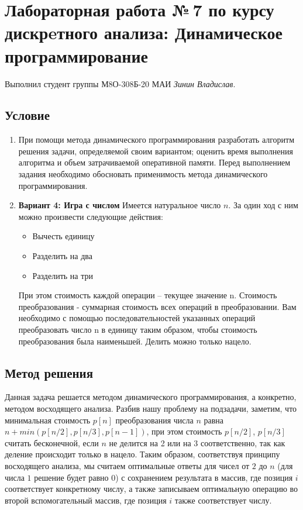 \documentclass[12pt]{article}
\begin{document}
    \section*{Лабораторная работа №\,7 по курсу дискрeтного анализа: 
    Динамическое программирование}

    Выполнил студент группы М8О-308Б-20 МАИ \textit{Зинин Владислав}.

    \subsection*{Условие}
 
    \begin{enumerate}
    \item При помощи метода динамического программирования разработать алгоритм 
    решения задачи, определяемой своим вариантом; оценить время выполнения 
    алгоритма и объем затрачиваемой оперативной памяти. Перед выполнением 
    задания необходимо обосновать применимость метода динамического 
    программирования.
    \item \textbf{Вариант 4: Игра с числом} Имеется натуральное число $n$. 
    За один ход с ним можно произвести следующие действия:
    \begin{itemize}
        \item Вычесть единицу
        \item Разделить на два
        \item Разделить на три
    \end{itemize}
    При этом стоимость каждой операции – текущее значение n. Стоимость преобразования - суммарная стоимость всех операций в преобразовании. 
    Вам необходимо с помощью последовательностей указанных операций преобразовать число n в единицу таким образом, чтобы стоимость преобразования была наименьшей. 
    Делить можно только нацело.
    \end{enumerate}

    \subsection*{Метод решения}

    Данная задача решается методом динамического программирования, а конкретно, методом восходящего анализа. Разбив нашу проблему на 
    подзадачи, заметим, что минимальная стоимость $p[n]$ преобразования числа $n$ равна $n + min(p[n/2], p[n/3], p[n - 1])$, при этом стоимость
    $p[n/2]$, $p[n/3]$ считать бесконечной, если $n$ не делится на 2 или на 3 соответственно, так как деление происходит только в нацело. Таким образом,
    соответствуя принципу восходящего анализа, мы считаем оптимальные ответы для чисел от $2$ до $n$ (для числа $1$ решение будет равно 0) с сохранением результата
    в массив, где позиция $i$ соответствует конкретному числу, а также записываем оптимальную операцию во второй вспомогательный массив, где позиция $i$ также соответствует 
    числу.
\end{document}
